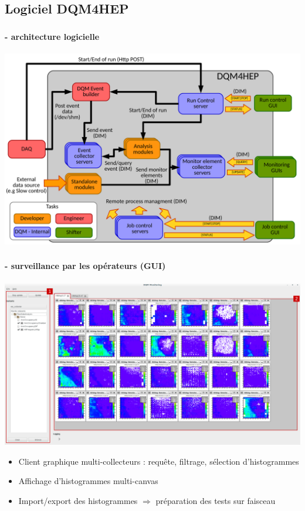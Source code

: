 \documentclass[8pt]{beamer}
\begin{document}
    \subsection{Logiciel DQM4HEP}

    \begin{frame}
    \frametitle{\secname}
    \framesubtitle{\subsecname - architecture logicielle}
      \begin{center}
        \includegraphics[width=\linewidth]{GlobalArchitectureDiagram.pdf}
      \end{center}
    \end{frame}



    \begin{frame}
    \frametitle{\secname}
    \framesubtitle{\subsecname - surveillance par les opérateurs (GUI)}
      \begin{center}
        \includegraphics[width=\linewidth]{MonitoringMainWindowGui.pdf}
      \end{center}
      \begin{itemize}
        \item Client graphique multi-collecteurs : requête, filtrage, sélection d'histogrammes
        \item Affichage d'histogrammes multi-canvas
        \item Import/export des histogrammes $\Rightarrow$ préparation des tests sur faisceau
      \end{itemize}
    \end{frame}
\end{document}
